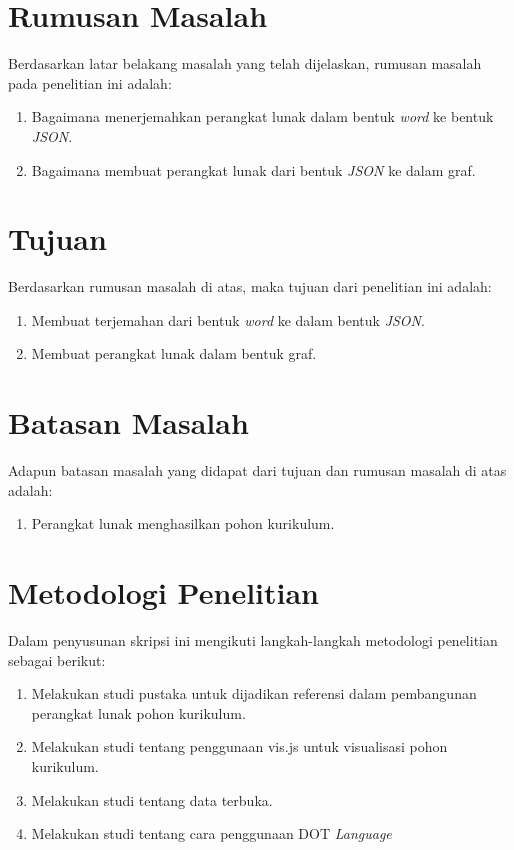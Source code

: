 \section{Rumusan Masalah}
Berdasarkan latar belakang masalah yang telah dijelaskan, rumusan masalah pada penelitian ini adalah:
\begin{enumerate}
\item Bagaimana menerjemahkan perangkat lunak dalam bentuk \textit{word} ke bentuk \textit{JSON}.
\item Bagaimana membuat perangkat lunak dari bentuk \textit{JSON} ke dalam graf.
\end{enumerate} 


\section{Tujuan}
Berdasarkan rumusan masalah di atas, maka tujuan dari penelitian ini adalah: 
\begin{enumerate}
\item Membuat terjemahan dari bentuk \textit{word} ke dalam bentuk \textit{JSON}.
\item Membuat perangkat lunak dalam bentuk graf.
\end{enumerate}

\section{Batasan Masalah}
\label{sec:batasan}
Adapun batasan masalah yang didapat dari tujuan dan rumusan masalah di atas adalah:

\begin{enumerate}
\item Perangkat lunak menghasilkan pohon kurikulum.
\end{enumerate}

\section{Metodologi Penelitian}
\label{sec:Metodologi Penelitian}
Dalam penyusunan skripsi ini mengikuti langkah-langkah metodologi penelitian sebagai berikut:

\begin{enumerate}
\item Melakukan studi pustaka untuk dijadikan referensi dalam pembangunan perangkat lunak pohon kurikulum.
\item Melakukan studi tentang penggunaan vis.js untuk visualisasi pohon kurikulum.
\item Melakukan studi tentang data terbuka.
\item Melakukan studi tentang cara penggunaan DOT \textit{Language}
\end{enumerate}

